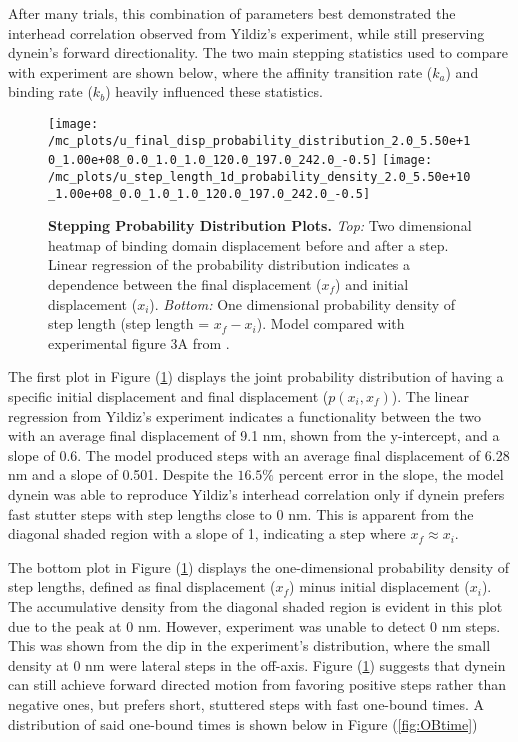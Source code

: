 After many trials, this combination of parameters best demonstrated the interhead correlation observed from Yildiz's experiment, while still preserving dynein's forward directionality. The two main stepping statistics used to compare with experiment are shown below, where the affinity transition rate ($k_a$) and binding rate ($k_b$) heavily influenced these statistics.  

\begin{figure}[H]
	\centering
	\texttt{[image: /mc\_plots/u\_final\_disp\_probability\_distribution\_2.0\_5.50e+10\_1.00e+08\_0.0\_1.0\_1.0\_120.0\_197.0\_242.0\_-0.5]}
	\texttt{[image: /mc\_plots/u\_step\_length\_1d\_probability\_density\_2.0\_5.50e+10\_1.00e+08\_0.0\_1.0\_1.0\_120.0\_197.0\_242.0\_-0.5]}
	\caption[Final Displacement Probability Distribution]{\textbf{Stepping Probability Distribution Plots.} \textit{Top:} Two dimensional heatmap of binding domain displacement before and after a step. Linear regression of the probability distribution indicates a dependence between the final displacement ($x_f$) and initial displacement ($x_i$). \textit{Bottom:} One dimensional probability density of step length (step length = $x_f-x_i$). Model compared with experimental figure 3A from \citep{Dewitt2012}.} 
	\label{fig:DataFitYildiz}
\end{figure}
\newpage
The first plot in Figure (\ref{fig:DataFitYildiz}) displays the joint probability distribution of having a specific initial displacement and final displacement ($p(x_i,x_f)$). The linear regression from Yildiz's experiment indicates a functionality between the two with an average final displacement of 9.1 nm, shown from the y-intercept, and a slope of 0.6. The model produced steps with an average final displacement of 6.28 nm and a slope of 0.501. Despite the $16.5\%$ percent error in the slope, the model dynein was able to reproduce Yildiz's interhead correlation only if dynein prefers fast stutter steps with step lengths close to 0 nm. This is apparent from the diagonal shaded region with a slope of 1, indicating a step where $x_f\approx x_i$.


The bottom plot in Figure (\ref{fig:DataFitYildiz}) displays the one-dimensional probability density of step lengths, defined as final displacement ($x_f$) minus initial displacement ($x_i$). The accumulative density from the diagonal shaded region is evident in this plot due to the peak at 0 nm. However, experiment was unable to detect 0 nm steps. This was shown from the dip in the experiment's distribution, where the small density at 0 nm were lateral steps in the off-axis. Figure (\ref{fig:DataFitYildiz}) suggests that dynein can still achieve forward directed motion from favoring positive steps rather than negative ones, but prefers short, stuttered steps with fast one-bound times. A distribution of said one-bound times is shown below in Figure (\ref{fig:OBtime}) 

